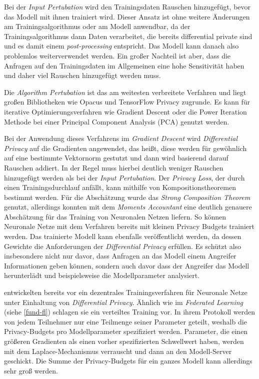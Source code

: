 Bei der \textit{Input Pertubation} wird den Trainingsdaten Rauschen hinzugefügt, bevor das Modell mit ihnen trainiert wird. Dieser Ansatz ist ohne weitere Änderungen am Trainingsalgorithmus oder am Modell anwendbar, da der Trainingsalgorithmus dann Daten verarbeitet, die bereits differential private sind und es damit einem \textit{post-processing} entspricht. Das Modell kann danach also problemlos weiterverwendet werden. Ein großer Nachteil ist aber, dass die Anfragen auf den Trainingsdaten im Allgemeinen eine hohe Sensitivität haben und daher viel Rauschen hinzugefügt werden muss.

Die \textit{Algorithm Pertubation} ist das am weitesten verbreitete Verfahren und liegt großen Bibliotheken wie Opacus \cite{yousefpour:2021} und TensorFlow Privacy \cite{tfprivacy} zugrunde. Es kann für iterative Optimierungsverfahren wie Gradient Descent oder die Power Iteration Methode bei einer Principal Component Analysis (PCA) genutzt werden.

Bei der Anwendung dieses Verfahrens im \textit{Gradient Descent} wird \textit{Differential Privacy} auf die Gradienten angewendet, das heißt, diese werden für gewöhnlich auf eine bestimmte Vektornorm gestutzt und dann wird basierend darauf Rauschen addiert. In der Regel muss hierbei deutlich weniger Rauschen hinzugefügt werden als bei der \textit{Input Pertubation}.\cite{chang:2023} Der \textit{Privacy Loss}, der durch einen Trainingsdurchlauf anfällt, kann mithilfe von Kompositionstheoremen bestimmt werden. Für die Abschätzung wurde das \textit{Strong Composition Theorem}\cite{dwork:2010} genutzt, allerdings konnten \textcite{abadi:2016} mit dem \textit{Moments Accountant} eine deutlich genauere Abschätzung für das Training von Neuronalen Netzen liefern. So können Neuronale Netze mit dem Verfahren bereits mit kleinen Privacy Budgets trainiert werden. Das trainierte Modell kann ebenfalls veröffentlicht werden, da dessen Gewichte die Anforderungen der \textit{Differential Privacy} erfüllen. Es schützt also insbesondere nicht nur davor, dass Anfragen an das Modell einem Angreifer Informationen geben können, sondern auch davor dass der Angreifer das Modell herunterlädt und beispielsweise die Modellparameter analysiert.

\textcite{shokri:2015} entwickelten bereits vor \textcite{abadi:2016} ein dezentrales Trainingsverfahren für Neuronale Netze unter Einhaltung von \textit{Differential Privacy}. Ähnlich wie im \textit{Federated Learning} (siehe \autoref{fund-fl}) schlagen sie ein verteiltes Training vor. In ihrem Protokoll werden von jedem Teilnehmer nur eine Teilmenge seiner Parameter geteilt, weshalb die Privacy-Budgets pro Modellparameter spezifiziert werden. Parameter, die einen größeren Gradienten als einen vorher spezifizierten Schwellwert haben, werden mit dem Laplace-Mechanismus verrauscht und dann an den Modell-Server geschickt. Die Summe der Privacy-Budgets für ein ganzes Modell kann allerdings sehr groß werden\cite[p.10]{abadi:2016}.

